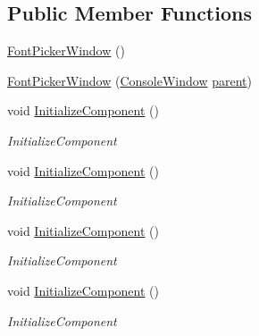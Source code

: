 \subsection*{Public Member Functions}
\begin{DoxyCompactItemize}
\item 
\hyperlink{class_c_p_u___o_s___simulator_1_1_font_picker_window_ac395cdfa521446c47bfded624bbfdba6}{Font\+Picker\+Window} ()
\item 
\hyperlink{class_c_p_u___o_s___simulator_1_1_font_picker_window_a8ff9dfbc882890c0b7b76468d51dd386}{Font\+Picker\+Window} (\hyperlink{class_c_p_u___o_s___simulator_1_1_console_window}{Console\+Window} \hyperlink{class_c_p_u___o_s___simulator_1_1_font_picker_window_a4e59cc593e060f3229adc8decfeb151c}{parent})
\item 
void \hyperlink{class_c_p_u___o_s___simulator_1_1_font_picker_window_aca751fede84bf642f74ddf1030cbf034}{Initialize\+Component} ()
\begin{DoxyCompactList}\small\item\em Initialize\+Component \end{DoxyCompactList}\item 
void \hyperlink{class_c_p_u___o_s___simulator_1_1_font_picker_window_aca751fede84bf642f74ddf1030cbf034}{Initialize\+Component} ()
\begin{DoxyCompactList}\small\item\em Initialize\+Component \end{DoxyCompactList}\item 
void \hyperlink{class_c_p_u___o_s___simulator_1_1_font_picker_window_aca751fede84bf642f74ddf1030cbf034}{Initialize\+Component} ()
\begin{DoxyCompactList}\small\item\em Initialize\+Component \end{DoxyCompactList}\item 
void \hyperlink{class_c_p_u___o_s___simulator_1_1_font_picker_window_aca751fede84bf642f74ddf1030cbf034}{Initialize\+Component} ()
\begin{DoxyCompactList}\small\item\em Initialize\+Component \end{DoxyCompactList}\end{DoxyCompactItemize}
